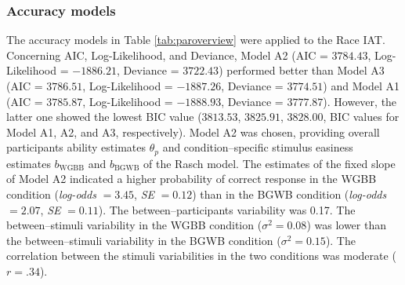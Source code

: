 \documentclass[12pt]{book}
\begin{document}
\subsubsection{Accuracy models} 
The accuracy models in Table \ref{tab:paroverview} were applied to the Race IAT.
Concerning AIC, Log-Likelihood, and Deviance, Model A2 (AIC = $3784.43$, Log-Likelihood = $-1886.21$, Deviance = $3722.43$) performed better than Model A3 (AIC = $3786.51$, Log-Likelihood  = $-1887.26$, Deviance  = $3774.51$) and Model A1 (AIC = $3785.87$, Log-Likelihood  = $-1888.93$, Deviance  = $3777.87$). However, the latter one showed the lowest BIC value ($3813.53$, $3825.91$, $3828.00$, BIC values for Model A1, A2, and A3, respectively). Model A2 was chosen, providing overall participants ability estimates $\theta_p$ and condition--specific stimulus easiness estimates $b_{\text{WGBB}}$ and $b_{\text{BGWB}}$ of the Rasch model.
The estimates of the fixed slope of Model A2 indicated a higher probability of correct response in the WGBB condition (\emph{log-odds} $= 3.45$, \emph{SE} $= 0.12$) than in the BGWB condition (\emph{log-odds} $= 2.07$, \emph{SE} $= 0.11$). The between--participants variability was 0.17. 
The between--stimuli variability in the WGBB condition ($\sigma^2 = 0.08$) was lower than the between--stimuli variability in the BGWB condition ($\sigma^2 = 0.15$). The correlation between the stimuli variabilities in the two conditions was moderate ($r = .34$). 
\end{document}
